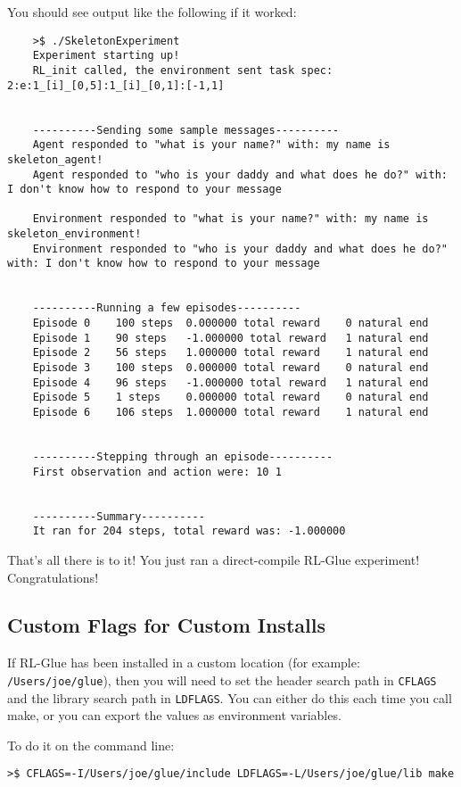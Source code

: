 \documentclass[11pt]{article}
\begin{document}
You should see output like the following if it worked:
\begin{verbatim}
	>$ ./SkeletonExperiment
	Experiment starting up!
	RL_init called, the environment sent task spec: 2:e:1_[i]_[0,5]:1_[i]_[0,1]:[-1,1]


	----------Sending some sample messages----------
	Agent responded to "what is your name?" with: my name is skeleton_agent!
	Agent responded to "who is your daddy and what does he do?" with: I don't know how to respond to your message

	Environment responded to "what is your name?" with: my name is skeleton_environment!
	Environment responded to "who is your daddy and what does he do?" with: I don't know how to respond to your message


	----------Running a few episodes----------
	Episode 0	 100 steps 	0.000000 total reward	 0 natural end 
	Episode 1	 90 steps 	-1.000000 total reward	 1 natural end 
	Episode 2	 56 steps 	1.000000 total reward	 1 natural end 
	Episode 3	 100 steps 	0.000000 total reward	 0 natural end 
	Episode 4	 96 steps 	-1.000000 total reward	 1 natural end 
	Episode 5	 1 steps 	0.000000 total reward	 0 natural end 
	Episode 6	 106 steps 	1.000000 total reward	 1 natural end 


	----------Stepping through an episode----------
	First observation and action were: 10 1


	----------Summary----------
	It ran for 204 steps, total reward was: -1.000000
\end{verbatim}

That's all there is to it! You just ran a direct-compile RL-Glue experiment! Congratulations!

\subsection{Custom Flags for Custom Installs}
\label{sec:custom-flags}
If RL-Glue has been installed in a custom location (for example: \texttt{/Users/joe/glue}), then you will
need to set the header search path in \texttt{CFLAGS} and the library search path in \texttt{LDFLAGS}.  You can either do this each time you call make, 
or you can export the values as environment variables.

To do it on the command line:
\begin{verbatim}
>$ CFLAGS=-I/Users/joe/glue/include LDFLAGS=-L/Users/joe/glue/lib make
\end{verbatim}
\end{document}
